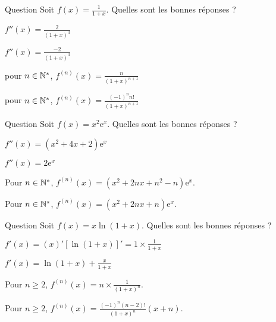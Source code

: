\begin{multi}[multiple,feedback=
{On a \(\displaystyle f'(x)=\frac{-1}{(1+x)^2}\), \(\displaystyle f''(x)=\frac{2}{(1+x)^3}\) et l'on vérifie, par récurrence, que
\[\forall n\in \Nn^*,\; f^{(n)}(x)=\frac{(-1)^nn!}{(1+x)^{n+1}}.\]
}]{Question}
Soit \(\displaystyle f(x)=\frac{1}{1+x}\). Quelles sont les bonnes réponses ?

    \item* \(\displaystyle f''(x)=\frac{2}{(1+x)^3}\)
    \item \(\displaystyle f''(x)=\frac{-2}{(1+x)^3}\)
    \item pour \(n\in \mathbb{N}^*\), \(\displaystyle f^{(n)}(x)=\frac{n}{(1+x)^{n+1}}\)
    \item* pour \(n\in \mathbb{N}^*\), \(\displaystyle f^{(n)}(x)=\frac{(-1)^nn!}{(1+x)^{n+1}}\)
\end{multi}


\begin{multi}{Question}
Soit \(\displaystyle f(x)=x^2\mathrm{e}^x\). Quelles sont les bonnes réponses ?

    \item* \(\displaystyle f''(x)=(x^2+4x+2)\mathrm{e}^x\)
    \item \(\displaystyle f''(x)=2\mathrm{e}^x\)
    \item* Pour \(n\in \mathbb{N}^*\), \(\displaystyle f^{(n)}(x)=(x^2+2nx+n^2-n)\mathrm{e}^x\).
    \item Pour \(n\in \mathbb{N}^*\), \(\displaystyle f^{(n)}(x)=(x^2+2nx+n)\mathrm{e}^x\).
\end{multi}


\begin{multi}[multiple,feedback=
{On applique la formule de Leibniz 
\[\displaystyle f^{(n)}(x)=\sum _{k=0}^n\mathrm{C}_n^k(x)^{(k)}(\ln (1+x))^{(n-k)}.\]
Mais \(\displaystyle \left[\ln (1+x)\right]^{(k)}=\frac{(-1)^{k-1}(k-1)!}{(1+x)^k}\). Ce qui donne
\[f^{(n)}(x)=\frac{(-1)^{n}(n-2)!}{(1+x)^n}\left(x+n\right).\]
}]{Question}
Soit \(\displaystyle f(x)=x\ln (1+x)\). Quelles sont les bonnes réponses ?

    \item \(\displaystyle f'(x)=(x)'[\ln (1+x)]'=1\times \frac{1}{1+x}\)
    \item* \(\displaystyle f'(x)=\ln (1+x)+\frac{x}{1+x}\)
    \item Pour \(n\geq 2\), \(\displaystyle f^{(n)}(x)=n\times \frac{1}{(1+x)^n}\).
    \item* Pour \(n\geq 2\), \(\displaystyle f^{(n)}(x)=\frac{(-1)^{n}(n-2)!}{(1+x)^n}\left(x+n\right)\).
\end{multi}


